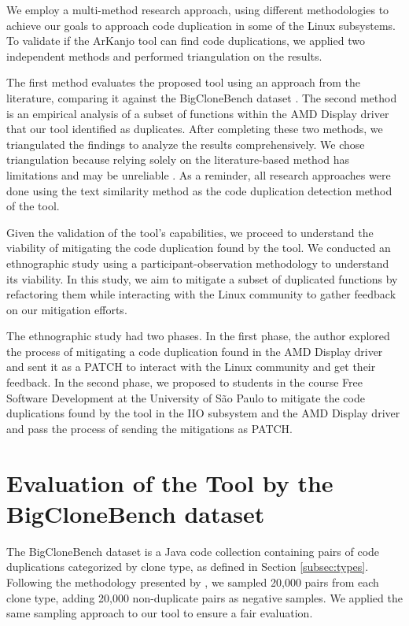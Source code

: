 We employ a multi-method research approach, using different methodologies to achieve our 
goals to approach code duplication in some of the Linux subsystems. To validate if the 
ArKanjo tool can find code duplications, we applied two independent methods and performed 
triangulation on the results.

The first method evaluates the proposed tool using an approach from the literature, 
comparing it against the BigCloneBench dataset \citep{bigclonebench}. 
The second method is an empirical analysis of a subset of functions within the 
AMD Display driver that our tool identified as duplicates. After completing these two 
methods, we triangulated the findings to analyze the results comprehensively. 
We chose triangulation because relying solely on the literature-based method has 
limitations and may be unreliable \citep{bigfail, litreview}. 
As a reminder, all research approaches were done using the text similarity method 
as the code duplication detection method of the tool.

Given the validation of the tool’s capabilities, we proceed to understand the viability 
of mitigating the code duplication found by the tool. We conducted an ethnographic study 
using a participant-observation methodology to understand its viability. In this study, 
we aim to mitigate a subset of duplicated functions by refactoring them while interacting 
with the Linux community to gather feedback on our mitigation efforts.

The ethnographic study had two phases. In the first phase, the author explored the process 
of mitigating a code duplication found in the AMD Display driver and sent it as a PATCH to 
interact with the Linux community and get their feedback. In the second phase, we proposed 
to students in the course Free Software Development at the University of São Paulo to mitigate 
the code duplications found by the tool in the IIO subsystem and the AMD Display driver and 
pass the process of sending the mitigations as PATCH.

\section{Evaluation of the Tool by the BigCloneBench dataset}

\label{sec:metbig}

The BigCloneBench dataset \citep{bigclonebench} is a Java code collection containing pairs of code duplications categorized by clone type, as defined in Section \ref{subsec:types}.
%
Following the methodology presented by \citep{tailor}, we sampled 20,000 pairs from each clone type, adding 20,000 non-duplicate pairs as negative samples. We applied the same sampling approach to our tool to ensure a fair evaluation.

